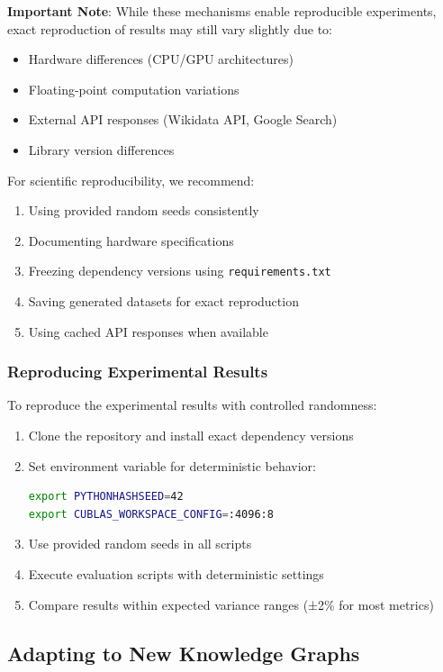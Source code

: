\textbf{Important Note}: While these mechanisms enable reproducible experiments, exact reproduction of results may still vary slightly due to:
\begin{itemize}
    \item Hardware differences (CPU/GPU architectures)
    \item Floating-point computation variations
    \item External API responses (Wikidata API, Google Search)
    \item Library version differences
\end{itemize}

For scientific reproducibility, we recommend:
\begin{enumerate}
    \item Using provided random seeds consistently
    \item Documenting hardware specifications
    \item Freezing dependency versions using \texttt{requirements.txt}
    \item Saving generated datasets for exact reproduction
    \item Using cached API responses when available
\end{enumerate}

\subsubsection{Reproducing Experimental Results}
To reproduce the experimental results with controlled randomness:

\begin{enumerate}
    \item Clone the repository and install exact dependency versions
    \item Set environment variable for deterministic behavior:
    \begin{lstlisting}[language=bash]
export PYTHONHASHSEED=42
export CUBLAS_WORKSPACE_CONFIG=:4096:8
    \end{lstlisting}
    \item Use provided random seeds in all scripts
    \item Execute evaluation scripts with deterministic settings
    \item Compare results within expected variance ranges (±2\% for most metrics)
\end{enumerate}

\subsection{Adapting to New Knowledge Graphs}
\label{subsec:adaptability}

